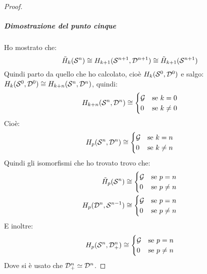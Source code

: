 \begin{proof}


  \subparagraph{Dimostrazione del punto cinque}

  Ho mostrato che:
  \[
    \tilde{H}_k(\mathcal{S}^{n}) \cong H_{k+1}(\mathcal{S}^{n+1}, \mathcal{D}^{n+1}) \cong \tilde{H}_{k+1}(\mathcal{S}^{n+1})
  \]
  Quindi parto da quello che ho calcolato, cioè $ H_k(\mathcal{S}^{0}, \mathcal{D}^{0}) $ e salgo:
  $ H_k(\mathcal{S}^{0}, \mathcal{D}^{0}) \cong H_{k+n}(\mathcal{S}^{n}, \mathcal{D}^{n}) $, quindi:
  \[
    H_{k+n}(\mathcal{S}^{n}, \mathcal{D}^{n}) \cong
    \begin{cases}
      \mathcal{G} & \text{se } k = 0 \\
      0 & \text{se } k \not = 0
    \end{cases}
  \]
  Cioè:
  \[
    H_{p}(\mathcal{S}^{n}, \mathcal{D}^{n}) \cong
    \begin{cases}
      \mathcal{G} & \text{se } k = n \\
      0 & \text{se } k \not = n
    \end{cases}
  \]
  Quindi gli isomorfismi che ho trovato trovo che:
  \begin{align*}
    \tilde{H}_p(\mathcal{S}^{n}) & \cong
    \begin{cases}
      \mathcal{G} & \text{se } p = n \\
      0 & \text{se } p \not = n
    \end{cases} \\
    H_p(\mathcal{D}^{n}, \mathcal{S}^{n-1}) & \cong
    \begin{cases}
      \mathcal{G} & \text{se } p = n \\
      0 & \text{se } p \not = n
    \end{cases}
  \end{align*}
  E inoltre:
  \[
    H_{p}(\mathcal{S}^{n}, \mathcal{D}^{n}_+) \cong
    \begin{cases}
      \mathcal{G} & \text{se } p = n \\
      0 & \text{se } p \not = n
    \end{cases}
  \]
  Dove si è usato che $ \mathcal{D}^{n}_+ \simeq \mathcal{D}^{n} $.
\end{proof}

